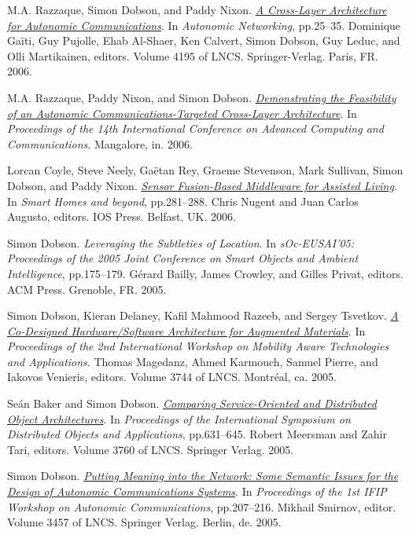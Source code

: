\documentclass[11pt]{article}
\begin{document}
\label{orgfc6c01d}M.A. Razzaque, Simon Dobson, and Paddy Nixon.  \emph{\href{https://simondobson.org/softcopy/WAC-06.pdf}{A Cross-Layer Architecture for Autonomic Communications}}. In \emph{Autonomic Networking}, pp.25–35. Dominique Gaïti, Guy Pujolle, Ehab Al-Shaer, Ken Calvert, Simon Dobson, Guy Leduc, and Olli Martikainen, editors. Volume 4195 of LNCS. Springer-Verlag. Paris, FR. 2006.

\label{orgf5ae30b}M.A. Razzaque, Paddy Nixon, and Simon Dobson.  \emph{\href{https://simondobson.org/softcopy/dictadcom-06.pdf}{Demonstrating the Feasibility of an Autonomic Communications-Targeted Cross-Layer Architecture}}. In \emph{Proceedings of the 14th International Conference on Advanced Computing and Communications}. Mangalore, in. 2006.

\label{orgb608b36}Lorcan Coyle, Steve Neely, Gaëtan Rey, Graeme Stevenson, Mark Sullivan, Simon Dobson, and Paddy Nixon.  \emph{\href{https://simondobson.org/softcopy/ICOST-06.pdf}{Sensor Fusion-Based Middleware for Assisted Living}}. In \emph{Smart Homes and beyond}, pp.281–288. Chris Nugent and Juan Carlos Augusto, editors. IOS Press. Belfast, UK. 2006.

\label{org09586e1}Simon Dobson.  \emph{Leveraging the Subtleties of Location}. In \emph{sOc-EUSAI’05: Proceedings of the 2005 Joint Conference on Smart Objects and Ambient Intelligence}, pp.175–179. Gérard Bailly, James Crowley, and Gilles Privat, editors. ACM Press. Grenoble, FR. 2005.

\label{org91e4792}Simon Dobson, Kieran Delaney, Kafil Mahmood Razeeb, and Sergey Tsvetkov.  \emph{\href{https://simondobson.org/softcopy/MATA-Augmented-05.pdf}{A Co-Designed Hardware/Software Architecture for Augmented Materials}}. In \emph{Proceedings of the 2nd International Workshop on Mobility Aware Technologies and Applications}. Thomas Magedanz, Ahmed Karmouch, Samuel Pierre, and Iakovos Venieris, editors. Volume 3744 of LNCS. Montréal, ca. 2005.

\label{orgdaf1e4e}Seán Baker and Simon Dobson.  \emph{\href{https://simondobson.org/softcopy/soa-doa-05.pdf}{Comparing Service-Oriented and Distributed Object Architectures}}. In \emph{Proceedings of the International Symposium on Distributed Objects and Applications}, pp.631–645. Robert Meersman and Zahir Tari, editors. Volume 3760 of LNCS. Springer Verlag. 2005.

\label{org7629611}Simon Dobson.  \emph{\href{https://simondobson.org/softcopy/WAC-04a.pdf}{Putting Meaning into the Network: Some Semantic Issues for the Design of Autonomic Communications Systems}}. In \emph{Proceedings of the 1st IFIP Workshop on Autonomic Communications}, pp.207–216. Mikhail Smirnov, editor. Volume 3457 of LNCS. Springer Verlag. Berlin, de. 2005.
\end{document}
